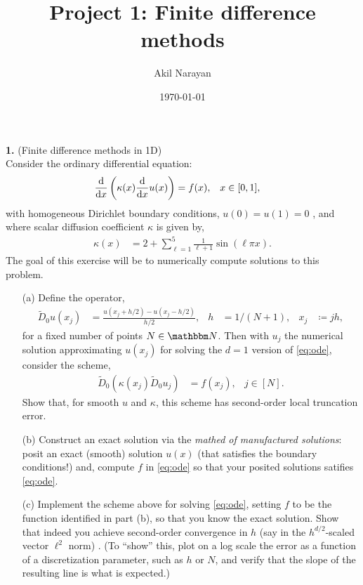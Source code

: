 \documentclass[11pt]{amsart}
\title{Project 1: Finite difference methods}
\author{Akil Narayan}
\date{\today}
\begin{document}
\maketitle

\textbf{1.} (Finite difference methods in 1D)\\
Consider the ordinary differential equation:
\begin{align}\label{eq:ode}
  \frac{\mathrm{d}}{\mathrm{d} x} \left(\kappa(x) \frac{\mathrm{d}}{\mathrm{d} x} u(x) \right) &= f(x), & x &\in [0,1],
\end{align}
with homogeneous Dirichlet boundary conditions, $u(0) = u(1) = 0$ , and where scalar diffusion coefficient $\kappa$ is given by,
  \begin{align*}
    \kappa(x) &= 2 + \sum_{\ell=1}^{5} \frac{1}{\ell+1} \sin( \ell \pi x ).
  \end{align*}
  The goal of this exercise will be to numerically compute solutions to this problem. \\[8pt]
  \begin{itemize}
    \item[(a)] Define the operator,
      \begin{align*}
        \widetilde{D}_0 u(x_j) &= \frac{u(x_j + h/2) - u(x_j - h/2)}{h/2}, & h &= 1/(N+1), & x_j &\coloneqq j h,
      \end{align*}
      for a fixed number of points $N \in \N$. Then with $u_j$ the numerical solution approximating $u(x_j)$ for solving the $d=1$ version of \eqref{eq:ode}, consider the scheme,
      \begin{align}\label{eq:D0-def}
        \widetilde{D}_0 \left( \kappa(x_j) \widetilde{D}_0 u_j \right) &= f(x_j), & j \in [N].
      \end{align}
      Show that, for smooth $u$ and $\kappa$, this scheme has second-order local truncation error.
    \item[(b)] Construct an exact solution via the \textit{mathed of manufactured solutions}: posit an exact (smooth) solution $u(x)$ (that satisfies the boundary conditions!) and, compute $f$ in \eqref{eq:ode} so that your posited solutions satifies \eqref{eq:ode}. 
    \item[(c)] Implement the scheme above for solving \eqref{eq:ode}, setting $f$ to be the function identified in part (b), so that you know the exact solution. Show that indeed you achieve second-order convergence in $h$ (say in the $h^{d/2}$-scaled vector $\ell^2$ norm) . (To ``show'' this, plot on a log scale the error as a function of a discretization parameter, such as $h$ or $N$, and verify that the slope of the resulting line is what is expected.)
  \end{itemize}
\end{document}
